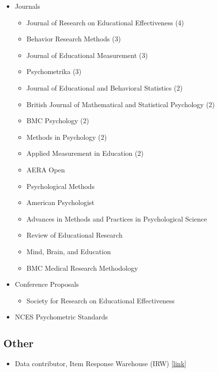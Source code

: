 \documentclass[11pt]{article}
\begin{document}
\begin{itemize}
    \item Journals
    \begin{itemize}
        \item  Journal of Research on Educational Effectiveness (4)
        \item Behavior Research Methods (3)
        \item Journal of Educational Measurement (3)
        \item Psychometrika (3)
        \item Journal of Educational and Behavioral Statistics (2)
        \item British Journal of Mathematical and Statistical Psychology (2)
        \item BMC Psychology (2)
        \item Methods in Psychology (2)
        \item Applied Measurement in Education (2)
        \item AERA Open
        \item Psychological Methods
        \item American Psychologist
        \item Advances in Methods and Practices in Psychological Science
        \item Review of Educational Research
        \item Mind, Brain, and Education
        \item BMC Medical Research Methodology
    \end{itemize}
    \item Conference Proposals
    \begin{itemize}
        \item Society for Research on Educational Effectiveness
    \end{itemize}
    \item NCES Psychometric Standards
\end{itemize}

\subsection{Other}

\begin{itemize}
    \item Data contributor, Item Response Warehouse (IRW) [\href{https://itemresponsewarehouse.org}{link}]
\end{itemize}
\end{document}
